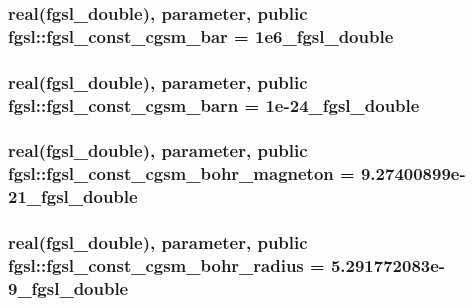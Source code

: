\hypertarget{classfgsl_a324807e6ca282345460f8918fc39f07f}{
\subsubsection[{fgsl\-\_\-const\-\_\-cgsm\-\_\-bar}]{\setlength{\rightskip}{0pt plus 5cm}real({\bf fgsl\-\_\-double}), parameter, public fgsl\-::fgsl\-\_\-const\-\_\-cgsm\-\_\-bar = 1e6\-\_\-fgsl\-\_\-double}}\label{classfgsl_a324807e6ca282345460f8918fc39f07f}
\hypertarget{classfgsl_a96f3fd765f8469355c932e287e34f25a}{
\subsubsection[{fgsl\-\_\-const\-\_\-cgsm\-\_\-barn}]{\setlength{\rightskip}{0pt plus 5cm}real({\bf fgsl\-\_\-double}), parameter, public fgsl\-::fgsl\-\_\-const\-\_\-cgsm\-\_\-barn = 1e-\/24\-\_\-fgsl\-\_\-double}}\label{classfgsl_a96f3fd765f8469355c932e287e34f25a}
\hypertarget{classfgsl_a106f93e7068726bf01947287eb77faed}{
\subsubsection[{fgsl\-\_\-const\-\_\-cgsm\-\_\-bohr\-\_\-magneton}]{\setlength{\rightskip}{0pt plus 5cm}real({\bf fgsl\-\_\-double}), parameter, public fgsl\-::fgsl\-\_\-const\-\_\-cgsm\-\_\-bohr\-\_\-magneton = 9.\-27400899e-\/21\-\_\-fgsl\-\_\-double}}\label{classfgsl_a106f93e7068726bf01947287eb77faed}
\hypertarget{classfgsl_a61da4815b82a64d0b0a2a5737ee854f5}{
\subsubsection[{fgsl\-\_\-const\-\_\-cgsm\-\_\-bohr\-\_\-radius}]{\setlength{\rightskip}{0pt plus 5cm}real({\bf fgsl\-\_\-double}), parameter, public fgsl\-::fgsl\-\_\-const\-\_\-cgsm\-\_\-bohr\-\_\-radius = 5.\-291772083e-\/9\-\_\-fgsl\-\_\-double}}\label{classfgsl_a61da4815b82a64d0b0a2a5737ee854f5}

